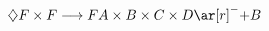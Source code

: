 \documentclass[preview]{standalone}
\begin{document}
\begin{align*}
\diamondsuit F \times F \longrightarrow  F  A\times B\times C\times D \ar[r]^-{+} &B
\end{align*}
\end{document}
